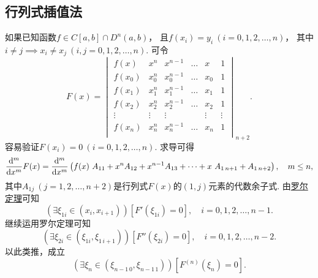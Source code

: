 \subsection{行列式插值法}
如果已知函数\(f \in C[a,b] \cap D^n(a,b)\)，
且\(f(x_i) = y_i\ (i=0,1,2,\dotsc,n)\)，
其中\(i \neq j \implies x_i \neq x_j\ (i,j=0,1,2,\dotsc,n)\).
可令\begin{equation*}
	F(x) = \begin{vmatrix}
		f(x) & x^n & x^{n-1} & \dots & x & 1 \\
		f(x_0) & x_0^n & x_0^{n-1} & \dots & x_0 & 1 \\
		f(x_1) & x_1^n & x_1^{n-1} & \dots & x_1 & 1 \\
		f(x_2) & x_2^n & x_2^{n-1} & \dots & x_2 & 1 \\
		\vdots & \vdots & \vdots & & \vdots & \vdots \\
		f(x_n) & x_n^n & x_n^{n-1} & \dots & x_n & 1 \\
	\end{vmatrix}_{n+2}.
\end{equation*}
容易验证\(F(x_i) = 0\ (i=0,1,2,\dotsc,n)\).
求导可得\begin{equation*}
	\dv[m]{x} F(x)
	= \dv[m]{x} \left(
		f(x)~A_{11}
		+ x^n A_{12}
		+ x^{n-1} A_{13}
		+ \dotsb
		+ x~A_{1\,n+1}
		+ A_{1\,n+2}
	\right),
	\quad m \leq n,
\end{equation*}
其中\(A_{1j}\ (j=1,2,\dotsc,n+2)\)是行列式\(F(x)\)的\((1,j)\)元素的代数余子式.
由\hyperref[theorem:微分中值定理.罗尔定理]{罗尔定理}可知\begin{equation*}
	(\exists\xi_{1i}\in(x_i,x_{i+1}))
	[F'(\xi_{1i}) = 0],
	\quad i=0,1,2,\dotsc,n-1.
\end{equation*}
继续运用罗尔定理可知\begin{equation*}
	(\exists\xi_{2i}\in(\xi_{1i},\xi_{1\,i+1}))
	[F''(\xi_{2i}) = 0],
	\quad i=0,1,2,\dotsc,n-2.
\end{equation*}
以此类推，成立\begin{equation*}
	(\exists\xi_n\in(\xi_{n-1\,0},\xi_{n-1\,1}))
	[F^{(n)}(\xi_n) = 0].
\end{equation*}
